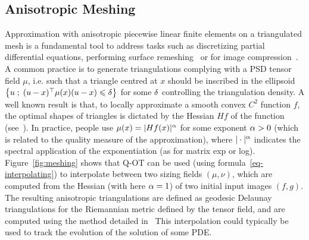 

\subsection{Anisotropic Meshing}

Approximation with anisotropic piecewise linear finite elements on a triangulated mesh is a fundamental tool to address tasks such as discretizing partial differential equations, performing surface remeshing~\cite{alliez2003anisotropic} or for image compression~\cite{demaret2006image}.
%
A common practice is to generate triangulations complying with a PSD tensor field $\mu$, i.e. such that a triangle centred at $x$ should be inscribed in the ellipsoid $\left\{ u \;;\; (u-x)^\top \mu(x) (u-x) \leqslant \delta  \right\}$ for some $\delta$ controlling the triangulation density. 
%
A well known result is that, to locally approximate a smooth convex $C^2$ function $f$,  the optimal shapes of triangles is dictated by the Hessian $H f$ of the function (see~\cite{shewchuk2002good}). In practice, people use $\mu(x) = |H f(x)|^\alpha$ for some exponent $\alpha > 0$ (which is related to the quality measure of the approximation), where $|\cdot|^\alpha$ indicates the spectral application of the exponentiation (as for matrix exp or log).
%
Figure~\eqref{fig:meshing} shows that Q-OT can be used (using formula~\eqref{eq-interpolating}) to interpolate between two sizing fields $(\mu,\nu)$, which are computed from the Hessian (with here $\alpha=1$) of two initial input images $(f,g)$.
%
The resulting anisotropic triangulations are defined as geodesic Delaunay triangulations for the Riemannian metric defined by the tensor field, and are computed using the method detailed in~\cite{peyre-iccv-09}
%
This interpolation could typically be used to track the evolution of the solution of some PDE. 


